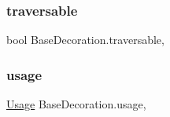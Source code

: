 \subsubsection{\texorpdfstring{traversable}{traversable}}
{\footnotesize\ttfamily bool Base\+Decoration.\+traversable\hspace{0.3cm}{\ttfamily [get]}, {\ttfamily [set]}}

\mbox{\label{class_base_decoration_a502a5352e9f53da746d96a75ff31c3f0}} 
\subsubsection{\texorpdfstring{usage}{usage}}
{\footnotesize\ttfamily \mbox{\hyperlink{class_base_decoration_ad8b9ff9e5d7dc488ca94fed2efa45a6e}{Usage}} Base\+Decoration.\+usage\hspace{0.3cm}{\ttfamily [get]}, {\ttfamily [set]}}

